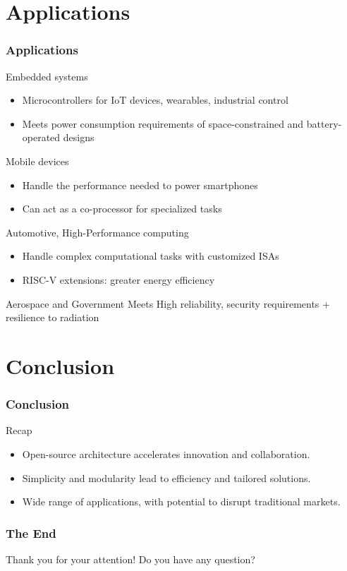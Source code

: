 \documentclass{beamer}
\begin{document}
		\section{Applications}
	\begin{frame}
		\frametitle{Applications}
		
		\begin{alertblock}{Embedded systems}
			\begin{itemize}
				\item Microcontrollers for IoT devices, wearables, industrial control
				\item Meets power consumption requirements of space-constrained and battery-operated designs
			\end{itemize}
		\end{alertblock}
		
		\begin{alertblock}{Mobile devices}
			\begin{itemize}
				\item Handle the performance needed to power smartphones
				\item Can act as a co-processor for specialized tasks
			\end{itemize}
		\end{alertblock}
		
		\begin{alertblock}{Automotive, High-Performance computing}
			\begin{itemize}
				\item Handle complex computational tasks with customized ISAs
				\item RISC-V extensions: greater energy efficiency
			\end{itemize}
		\end{alertblock}
		
		\begin{alertblock}{Aerospace and Government}
				Meets High reliability, security requirements + resilience to radiation
		\end{alertblock}
	\end{frame}
	
	\section{Conclusion}
	\begin{frame}
		\frametitle{Conclusion}
		
		\begin{alertblock}{Recap}
			\begin{itemize}
				\item Open-source architecture accelerates innovation and collaboration.
				\item Simplicity and modularity lead to efficiency and tailored solutions.
				\item Wide range of applications, with potential to disrupt traditional markets.
			\end{itemize}
		\end{alertblock}
	\end{frame}
	
	\begin{frame}
		\frametitle{The End}
		
		\centering
		Thank you for your attention!
		\linebreak
		Do you have any question?
	\end{frame}
\end{document}
